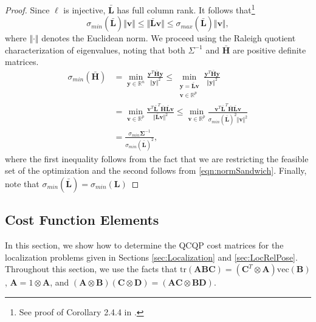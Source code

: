 \documentclass[lettersize,journal]{IEEEtran}
\newcommand{\vect}[1]{\mbox{vec}(#1)}
\newcommand{\tr}[1]{\mbox{tr}\left(#1\right)}
\begin{document}
{\begin{proof}
Since $\bm{\ell}$ is injective, $\bar{\bm{L}}$ has full column rank. It follows that\footnote{See proof of Corollary 2.4.4 in \cite{golubMatrixComputations2013}.}
\begin{equation}\label{eqn:normSandwich}
	\sigma_{min}(\bar{\bm{L}}) \Vert\bm{v}\Vert \leq  \Vert\bar{\bm{L}}\bm{v}\Vert \leq \sigma_{max}(\bar{\bm{L}})\Vert\bm{v}\Vert,
\end{equation}
where $\Vert\cdot\Vert$ denotes the Euclidean norm. We proceed using the Raleigh quotient characterization of eigenvalues, noting that both $\Sigma^{-1}$ and $\bar{\bm{H}}$ are positive definite matrices.
\begin{align*}
	\sigma_{min}(\bar{\bm{H}}) &= \min\limits_{\bm{y}\in\mathbb{R}^n} \frac{\bm{y}^T \bar{\bm{H}} \bm{y}}{\Vert\bm{y}\Vert^2} 
	\leq \min\limits_{\substack{\bm{y}=\bar{\bm{L}}\bm{v}\\\bm{v}\in\mathbb{R}^p}} \frac{\bm{y}^T \bar{\bm{H}} \bm{y}}{\Vert\bm{y}\Vert^2} \\&= \min\limits_{\bm{v}\in\mathbb{R}^p} \frac{\bm{v}^T \bar{\bm{L}}^T\bar{\bm{H}}\bar{\bm{L}} \bm{v}}{\Vert\bar{\bm{L}}\bm{v}\Vert^2 }  
	\leq \min\limits_{\bm{v}\in\mathbb{R}^p} \frac{\bm{v}^T \bar{\bm{L}}^T\bar{\bm{H}}\bar{\bm{L}} \bm{v}}{\sigma_{min}(\bar{\bm{L}})^2\Vert\bm{v}\Vert^2 } 
	\\&= \frac{\sigma_{min}{\bm{\Sigma}^{-1}}}{\sigma_{min}(\bar{\bm{L}})^2},
\end{align*}
where the first inequality follows from the fact that we are restricting the feasible set of the optimization and the second follows from \eqref{eqn:normSandwich}. Finally, note that $\sigma_{min}(\bar{\bm{L}}) = \sigma_{min}(\bm{L})$

\end{proof}

\subsection{Cost Function Elements}\label{SM:LocCost}

In this section, we show how to determine the QCQP cost matrices for the localization problems given in Sections \ref{sec:Localization} and \ref{sec:LocRelPose}. Throughout this section, we use the facts that $ \tr{\bm{A}\bm{B}\bm{C}} = (\bm{C}^T\otimes\bm{A}) \vect{\bm{B}}$, $ \bm{A} = 1\otimes\bm{A} $, and $ (\bm{A}\otimes\bm{B})(\bm{C}\otimes\bm{D}) = (\bm{AC}\otimes\bm{BD}) $\cite{magnusMatrixDifferentialCalculus2019}. 

}
\end{document}
